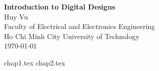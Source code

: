 \documentclass[12pt, a4paper]{article}
\begin{document}
\begin{titlepage}
    \centering
    \vspace*{1in}

    {\LARGE \bfseries Introduction to Digital Designs}\\[1.5cm]

    {\large Huy Vu}\\[0.5cm]
    {\large Faculty of Electrical and Electronics Engineering}\\
    {\large Ho Chi Minh City University of Technology}\\[2cm]

    {\large \today}

    \vfill
\end{titlepage}
\tableofcontents
\newpage
{chap1.tex}
\newpage
{chap2.tex}
\end{document}
